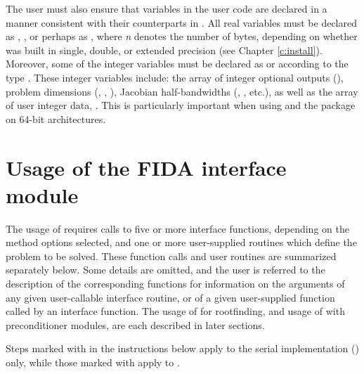 The user must also ensure that variables in the user {\F} code are
declared in a manner consistent with their counterparts in {\ida}.
All real variables must be declared as , ,
or perhaps as , where {\em n} denotes the number of bytes,
depending on whether {\ida} was built in single, double, or extended precision 
(see Chapter \ref{c:install}). Moreover, some of the {\F} integer variables
must be declared as  or  according to the 
{\C} type . These integer variables include: the array of
integer optional outputs (), problem dimensions (,
, ), Jacobian half-bandwidths (, , etc.),
as well as the array of user integer data, .
This is particularly important when using {\ida} and the {\fida}
package on 64-bit architectures.

\section{Usage of the FIDA interface module}\label{ss:fida_usage}

The usage of {\fida} requires calls to five or more interface
functions, depending on the method options selected, and one or more
user-supplied routines which define the problem to be solved.  These
function calls and user routines are summarized separately below.
Some details are omitted, and the user is referred to the description
of the corresponding {\ida} functions for information on the arguments 
of any given user-callable interface routine, or of a given user-supplied 
function called by an interface function.
The usage of {\fida} for rootfinding, and usage of {\fida} with
preconditioner modules, are each described in later sections.

Steps marked with {\s} in the instructions below apply to the serial
{\nvector} implementation ({\nvecs}) only, while those marked with {\p}
apply to {\nvecp}.

